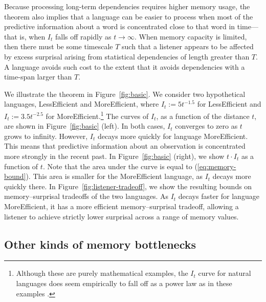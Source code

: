 

Because processing long-term dependencies requires higher memory usage, the theorem also implies that a language can be easier to process when most of the predictive information about a word is concentrated close to that word in time---that is, when $I_t$ falls off rapidly as $t \rightarrow \infty$. When memory capacity is limited, then there must be some timescale $T$ such that a listener appears to be affected by excess surprisal arising from statistical dependencies of length greater than $T$. A language avoids such cost to the extent that it avoids dependencies with a time-span larger than $T$.

We illustrate the theorem in Figure~\ref{fig:basic}.
We consider two hypothetical languages, LessEfficient and MoreEfficient, where $I_t := 5t^{-1.5}$ for LessEfficient and $I_t := 3.5 t^{-2.5}$ for MoreEfficient.\footnote{Although these are purely mathematical examples, the $I_t$ curve for natural languages does seem empirically to fall off as a power law as in these examples \citep{debowski2016relaxed}.}
The curves of $I_t$, as a function of the distance $t$, are shown in Figure~\ref{fig:basic} (left).
In both cases, $I_t$ converges to zero as $t$ grows to infinity. 
However, $I_t$ decays more quickly for language MoreEfficient.
This means that predictive information about an observation is concentrated more strongly in the recent past.
In Figure~\ref{fig:basic} (right), we show $t\cdot I_t$ as a function of $t$.
Note that the area under the curve is equal to (\ref{eq:memory-bound}).
This area is smaller for the MoreEfficient language, as $I_t$ decays more quickly there.  
In Figure~\ref{fig:listener-tradeoff}, we show the resulting bounds on memory--surprisal tradeoffs of the two languages.  
As $I_t$ decays faster for language MoreEfficient, it has a more efficient memory--surprisal tradeoff, allowing a listener to achieve strictly lower surprisal across a range of memory values.

\subsection{Other kinds of memory bottlenecks}


